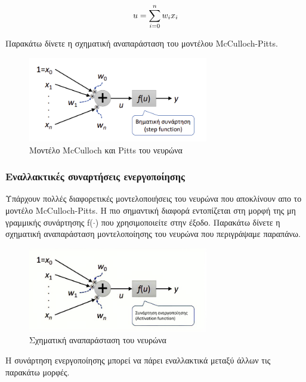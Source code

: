 \documentclass[12pt]{article}
\numberwithin{equation}{section}
\begin{document}
\begin{equation}
\large
u = \sum_{i=0}^{n} w_i x_i 
\end{equation}

\noindent Παρακάτω δίνετε η σχηματική αναπαράσταση του μοντέλου McCulloch-Pitts.

\begin{figure}[h!]
  \centering
  \includegraphics[width=0.7\textwidth]{images/McCulloch-Pitts.png} %
  \caption{Μοντέλο McCulloch και Pitts του νευρώνα}
  \label{figure 10}
\end{figure}

\subsubsection{Εναλλακτικές συναρτήσεις ενεργοποίησης} 

Υπάρχουν πολλές διαφορετικές μοντελοποιήσεις του νευρώνα που αποκλίνουν απο το μοντέλο McCulloch-Pitts. Η πιο σημαντική διαφορά εντοπίζεται στη μορφή της μη γραμμικής συνάρτησης f(\(\cdot\)) που χρησιμοποιείτε στην έξοδο. Παρακάτω δίνετε η σχηματική αναπαράσταση μοντελοποίησης του νευρώνα που περιγράψαμε παραπάνω. \\

\begin{figure}[h!]
  \centering
  \includegraphics[width=0.7\textwidth]{images/neuron_modeling.png} %
  \caption{Σχηματική αναπαράσταση του νευρώνα}
  \label{figure 11}
\end{figure} 

\noindent Η συνάρτηση ενεργοποίησης μπορεί να πάρει εναλλακτικά μεταξύ άλλων τις παρακάτω μορφές.\\
\end{document}
